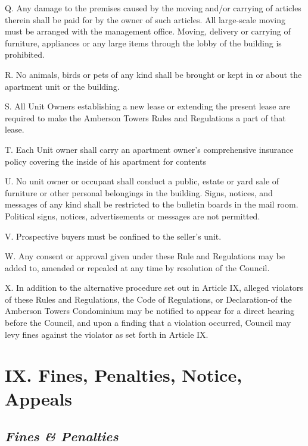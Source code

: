 \documentclass[
]{book}
\begin{document}
Q. Any damage to the premises caused by the moving and/or carrying of articles therein shall be paid for by the owner of such articles. All large-scale moving must be arranged with the management office. Moving, delivery or carrying of furniture, appliances or any large items through the lobby of the building is prohibited.

R. No animals, birds or pets of any kind shall be brought or kept in or about the apartment unit or the building.

S. All Unit Owners establishing a new lease or extending the present lease are required to make the Amberson Towers Rules and Regulations a part of that lease.

T. Each Unit owner shall carry an apartment owner's comprehensive insurance policy covering the inside of his apartment for contents

U. No unit owner or occupant shall conduct a public, estate or yard sale of furniture or other personal belongings in the building. Signs, notices, and messages of any kind shall be restricted to the bulletin boards in the mail room. Political signs, notices, advertisements or messages are not permitted.

V. Prospective buyers must be confined to the seller's unit.

W. Any consent or approval given under these Rule and Regulations may be added to, amended or repealed at any time by resolution of the Council.

X. In addition to the alternative procedure set out in Article IX, alleged violators of these Rules and Regulations, the Code of Regulations, or Declaration-of the Amberson Towers Condominium may be notified to appear for a direct hearing before the Council, and upon a finding that a violation occurred, Council may levy fines against the violator as set forth in Article IX.

\hypertarget{ix.-fines-penalties-notice-appeals-1}{%
\section*{IX. Fines, Penalties, Notice, Appeals}\label{ix.-fines-penalties-notice-appeals-1}}

\hypertarget{fines-penalties-1}{%
\subsection*{\texorpdfstring{\emph{Fines \& Penalties}}{Fines \& Penalties}}\label{fines-penalties-1}}
\end{document}
